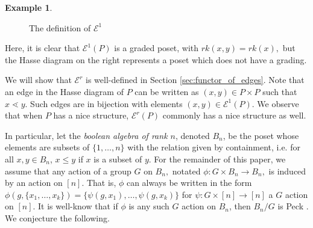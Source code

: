 \documentclass[10 pt]{amsart}
\theoremstyle{plain}
\theoremstyle{definition}
\newtheorem{eg}[thm]{Example}
\theoremstyle{remark}
\numberwithin{equation}{section}
\begin{document}
\begin{eg}
\begin{figure}
\begin{center}
\iffalse
\newline
\begin{tikzpicture}[scale=.7]
  \node (one) at (90:2cm) {$6$};
  \node (b) at (150:2cm) {$4$};
  \node (a) at (210:2cm) {$2$};
  \node (zero) at (270:2cm) {$1$};
  \node (c) at (330:2cm) {$3$};
  \node (d) at (30:2cm) {$5$};
  \draw (zero) -- (a) -- (b) -- (one) -- (d) -- (c) -- (zero);
\end{tikzpicture}
\begin{tikzpicture}[scale=.7]
  \node (one) at (60:2cm) {$(5, 6)$};
  \node (b) at (120:2cm) {$(4, 6)$};
  \node (a) at (180:2cm) {$(2, 4)$};
  \node (zero) at (240:2cm) {$(1, 2)$};
  \node (c) at (300:2cm) {$(1,3)$};
  \node (d) at (0:2cm) {$(3, 5)$};
  \draw (zero) -- (a) -- (b);
  \draw (c)--(d)--(one);
\end{tikzpicture}
\begin{tikzpicture}[scale=.7]
  \node (one) at (60:2cm) {$(5, 6)$};
  \node (b) at (120:2cm) {$(4, 6)$};
  \node (a) at (180:2cm) {$(2, 4)$};
  \node (zero) at (240:2cm) {$(1, 2)$};
  \node (c) at (300:2cm) {$(1, 3)$};
  \node (d) at (0:2cm) {$(3, 5)$};
  \draw (zero) -- (a) -- (b) -- (c)--(d)--(one) -- (zero);
\end{tikzpicture}
\fi
\caption{\label{fig:EP_definition_example}The definition of $\mathcal E^1$}
\end{center}
\end{figure}
Here, it is clear that $\mathcal E^1(P)$ is a graded poset, with $rk(x,y) = rk(x),$ but the Hasse diagram on the right represents a poset which does not have a grading.
\end{eg}



We will show that $\mathcal E^r$ is well-defined in Section \ref{sec:functor_of_edges}. Note that an edge in the Hasse diagram of $P$ can be written as $(x,y)\in P\times P$ such that $x\lessdot y$. Such edges are in bijection with elements $(x, y)\in \mathcal E^1(P).$  
We observe that when $P$ has a nice structure, $\mathcal E^r(P)$ commonly has a nice structure as well.  

In particular, let the \textit{boolean algebra of rank $n$}, denoted $B_n$, be the poset whose elements are subsets of $\{1,\ldots,n\}$ with the relation given by containment, i.e. for all $x,y\in B_n$, $x\le y$ if $x$ is a subset of $y$. For the remainder of this paper, we assume that any action of a group $G$ on $B_n,$ notated $\phi:G \times B_n \rightarrow B_n,$ is induced by an action on $[n].$ That is, $\phi$ can always be written in the form $\phi(g,\{x_1,\ldots, x_k\}) = \{\psi(g,x_1),\ldots, \psi(g,x_k)\}$ for $\psi:G\times [n] \rightarrow [n]$ a $G$ action on $[n]$.
It is well-know that if $\phi$ is any such $G$ action on $B_n$, then $B_n/G$ is Peck .  We conjecture the following.
\end{document}
